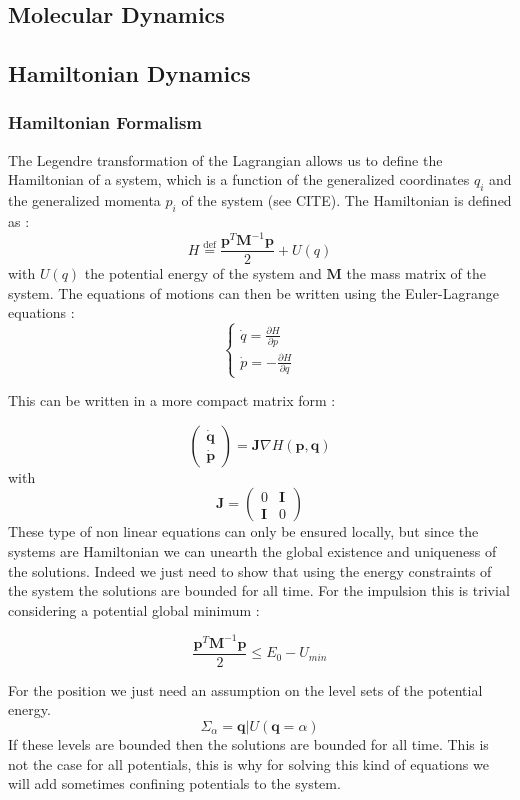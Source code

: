 \documentclass[ansiapaper]{report}
\newcommand*{\defeq}{\stackrel{\text{def}}{=}}
\begin{document}
\begin{multicols}{3}
	\chapter{Molecular Dynamics}
	\section{Hamiltonian Dynamics}
	\subsection{Hamiltonian Formalism}

	The Legendre transformation of the Lagrangian allows us to define the Hamiltonian of a system, which is a function of the generalized coordinates $q_i$ and the generalized momenta $p_i$ of the system (see CITE). The Hamiltonian is defined as :
	$$ H \defeq \frac{\textbf{p} ^T \textbf{M} ^{-1} \textbf{p}  }{2} + U(q)$$
	with $U(q)$ the potential energy of the system and $\textbf{M}$ the mass matrix of the system. The equations of motions can then be written using the Euler-Lagrange equations :
	$$
		\begin{cases}
			\dot{q} = \frac{\partial H}{\partial p} \\
			\dot{p} = -\frac{\partial H}{\partial q}
		\end{cases}
	$$

	This can be written in a more compact matrix form :

	$$ \begin{pmatrix}
			\dot{\textbf{q} } \\
			\dot{\textbf{p} }
		\end{pmatrix} = \textbf{J} \nabla H(\textbf{p} ,\textbf{q} )
	$$
	with $$\textbf{J} = \begin{pmatrix}
			0          & \textbf{I} \\
			\textbf{I} & 0
		\end{pmatrix} $$
	These type of non linear equations can only be ensured locally, but since the systems are Hamiltonian we can unearth the global existence and uniqueness of the solutions. Indeed we just need to show that using the energy constraints of the system the solutions are bounded for all time. For the impulsion this is trivial considering a potential global minimum :

	$$ \frac{\textbf{p}^T \textbf{M} ^{-1} \textbf{p} }{2} \leq E_0 - U_{min}$$

	For the position we just need an assumption on the level sets of the potential energy. $$ \Sigma_{\alpha} = {\textbf{q}|U(\textbf{q} = \alpha) }$$
	If these levels are bounded then the solutions are bounded for all time. This is not the case for all potentials, this is why for solving this kind of equations we will add sometimes confining potentials to the system.

\end{multicols}
\end{document}
